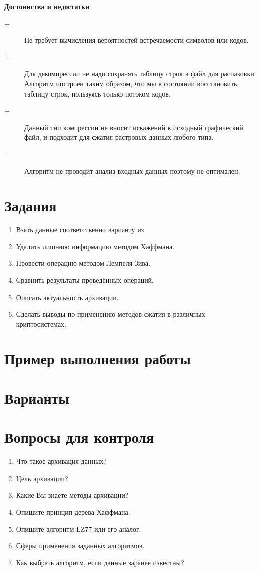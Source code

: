 \noindent\textbf{Достоинства и недостатки}
\begin{description}
  \item[+] Не требует вычисления вероятностей встречаемости символов или
      кодов.
  \item[+] Для декомпрессии не надо сохранять таблицу строк в файл для
      распаковки. Алгоритм построен таким образом, что мы в состоянии
      восстановить таблицу строк, пользуясь только потоком кодов.
  \item[+] Данный тип компрессии не вносит искажений в исходный графический
      файл, и подходит для сжатия растровых данных любого типа.
  \item[-]Алгоритм не проводит анализ входных данных поэтому не оптимален.
\end{description}

\section{Задания}\label{sect8_b}
\begin{enumerate}
  \item Взять данные соответственно варианту из 
  \item Удалить лишнюю информацию методом Хаффмана.
  \item Провести операцию методом Лемпеля-Зива.
  \item Сравнить результаты проведённых операций.
  \item Описать актуальность архивации.
  \item Сделать выводы по применению методов сжатия в различных
      криптосистемах.
\end{enumerate}
\section{Пример выполнения работы}\label{sect8_c}
%
\section{Варианты}\label{sect8_d}
%
\section{Вопросы для контроля}\label{sect8_e}
%
\begin{enumerate}
  \item Что такое архивация данных?
  \item Цель архивации?
  \item Какие Вы знаете методы архивации?
  \item Опишите принцип дерева Хаффмана.
  \item Опишите алгоритм LZ77 или его аналог.
  \item Сферы применения заданных алгоритмов.
  \item Как выбрать алгоритм, если данные заранее известны?
\end{enumerate}
